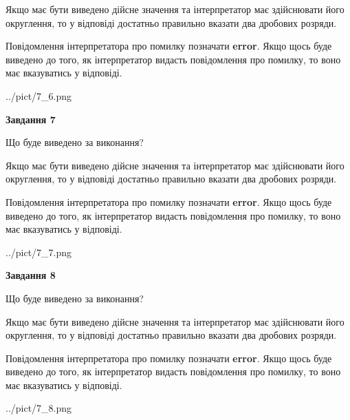 \documentclass[12pt, ukrainian]{article}
\begin{document}
{\begin {Large}
Якщо має бути виведено дійсне значення та інтерпретатор має здійснювати його округлення, 
то у відповіді достатньо правильно вказати два дробових розряди.

Повідомлення інтерпретатора про помилку позначати \textbf{error}.
Якщо щось буде виведено до того, як інтерпретатор видасть повідомлення про помилку, 
то воно має вказуватись у відповіді. \par

\begin{center}
	{../pict/7_6.png}
\end{center}
\newpage

{\begin {center}\textbf{Завдання 7}\end {center}}\par
Що буде виведено за виконання? \par

Якщо має бути виведено дійсне значення та інтерпретатор має здійснювати його округлення, 
то у відповіді достатньо правильно вказати два дробових розряди.

Повідомлення інтерпретатора про помилку позначати \textbf{error}.
Якщо щось буде виведено до того, як інтерпретатор видасть повідомлення про помилку, 
то воно має вказуватись у відповіді. \par

\begin{center}
	{../pict/7_7.png}
\end{center}
\newpage

{\begin {center}\textbf{Завдання 8}\end {center}}\par
Що буде виведено за виконання? \par

Якщо має бути виведено дійсне значення та інтерпретатор має здійснювати його округлення, 
то у відповіді достатньо правильно вказати два дробових розряди.

Повідомлення інтерпретатора про помилку позначати \textbf{error}.
Якщо щось буде виведено до того, як інтерпретатор видасть повідомлення про помилку, 
то воно має вказуватись у відповіді. \par

\begin{center}
	{../pict/7_8.png}
\end{center}
\newpage


\end{Large}}
\end{document}
